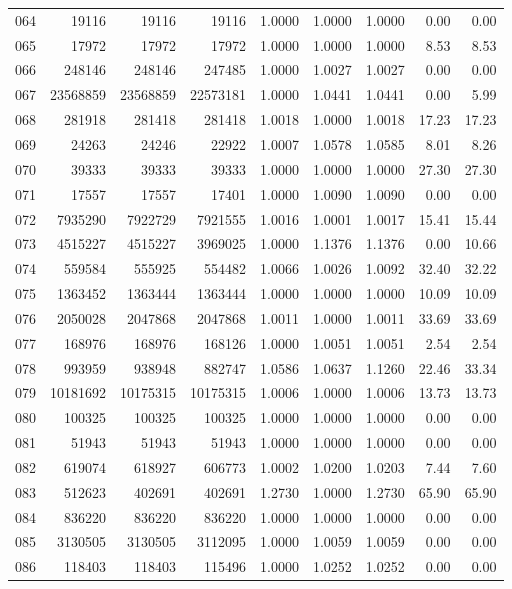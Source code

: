 \begin{longtable}{crrrrrrrr}
064 & 19116 & 19116 & 19116 & 1.0000 & 1.0000 & 1.0000 & 0.00 & 0.00 \\
065 & 17972 & 17972 & 17972 & 1.0000 & 1.0000 & 1.0000 & 8.53 & 8.53 \\
066 & 248146 & 248146 & 247485 & 1.0000 & 1.0027 & 1.0027 & 0.00 & 0.00 \\
067 & 23568859 & 23568859 & 22573181 & 1.0000 & 1.0441 & 1.0441 & 0.00 & 5.99 \\
068 & 281918 & 281418 & 281418 & 1.0018 & 1.0000 & 1.0018 & 17.23 & 17.23 \\
069 & 24263 & 24246 & 22922 & 1.0007 & 1.0578 & 1.0585 & 8.01 & 8.26 \\
070 & 39333 & 39333 & 39333 & 1.0000 & 1.0000 & 1.0000 & 27.30 & 27.30 \\
071 & 17557 & 17557 & 17401 & 1.0000 & 1.0090 & 1.0090 & 0.00 & 0.00 \\
072 & 7935290 & 7922729 & 7921555 & 1.0016 & 1.0001 & 1.0017 & 15.41 & 15.44 \\
073 & 4515227 & 4515227 & 3969025 & 1.0000 & 1.1376 & 1.1376 & 0.00 & 10.66 \\
074 & 559584 & 555925 & 554482 & 1.0066 & 1.0026 & 1.0092 & 32.40 & 32.22 \\
075 & 1363452 & 1363444 & 1363444 & 1.0000 & 1.0000 & 1.0000 & 10.09 & 10.09 \\
076 & 2050028 & 2047868 & 2047868 & 1.0011 & 1.0000 & 1.0011 & 33.69 & 33.69 \\
077 & 168976 & 168976 & 168126 & 1.0000 & 1.0051 & 1.0051 & 2.54 & 2.54 \\
078 & 993959 & 938948 & 882747 & 1.0586 & 1.0637 & 1.1260 & 22.46 & 33.34 \\
079 & 10181692 & 10175315 & 10175315 & 1.0006 & 1.0000 & 1.0006 & 13.73 & 13.73 \\
080 & 100325 & 100325 & 100325 & 1.0000 & 1.0000 & 1.0000 & 0.00 & 0.00 \\
081 & 51943 & 51943 & 51943 & 1.0000 & 1.0000 & 1.0000 & 0.00 & 0.00 \\
082 & 619074 & 618927 & 606773 & 1.0002 & 1.0200 & 1.0203 & 7.44 & 7.60 \\
083 & 512623 & 402691 & 402691 & 1.2730 & 1.0000 & 1.2730 & 65.90 & 65.90 \\
084 & 836220 & 836220 & 836220 & 1.0000 & 1.0000 & 1.0000 & 0.00 & 0.00 \\
085 & 3130505 & 3130505 & 3112095 & 1.0000 & 1.0059 & 1.0059 & 0.00 & 0.00 \\
086 & 118403 & 118403 & 115496 & 1.0000 & 1.0252 & 1.0252 & 0.00 & 0.00 \\

\end{longtable}
